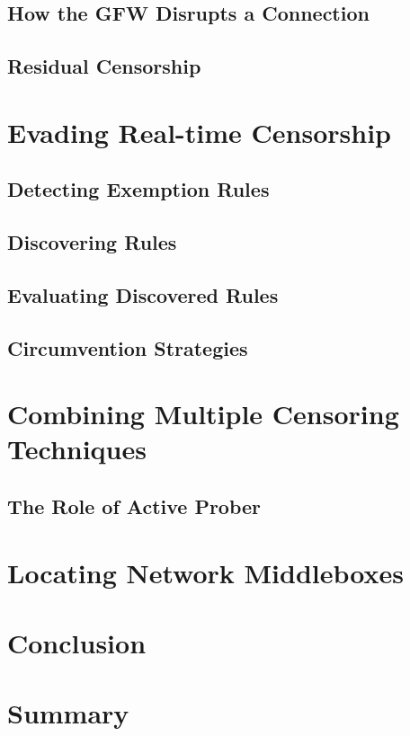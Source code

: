 \subsection{How the GFW Disrupts a Connection}

\subsection{Residual Censorship}

\section{Evading Real-time Censorship}

\subsection{Detecting Exemption Rules}

\subsection{Discovering Rules}

\subsection{Evaluating Discovered Rules}

\subsection{Circumvention Strategies}

\section{Combining Multiple Censoring Techniques}

\subsection{The Role of Active Prober}

\section{Locating Network Middleboxes}

\section{Conclusion}

\section{Summary}